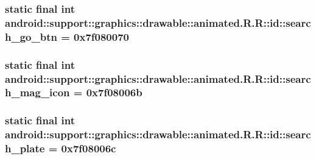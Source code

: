 \hypertarget{classandroid_1_1support_1_1graphics_1_1drawable_1_1animated_1_1_r_1_1id_186033891ff2b2fa7553756b01c98b4a}{
\subsubsection[{search\_\-go\_\-btn}]{\setlength{\rightskip}{0pt plus 5cm}static final int android::support::graphics::drawable::animated.R.R::id::search\_\-go\_\-btn = 0x7f080070}}
\label{classandroid_1_1support_1_1graphics_1_1drawable_1_1animated_1_1_r_1_1id_186033891ff2b2fa7553756b01c98b4a}


\hypertarget{classandroid_1_1support_1_1graphics_1_1drawable_1_1animated_1_1_r_1_1id_9df229b231a2cbe52d8a0ac2d3d122d9}{
\subsubsection[{search\_\-mag\_\-icon}]{\setlength{\rightskip}{0pt plus 5cm}static final int android::support::graphics::drawable::animated.R.R::id::search\_\-mag\_\-icon = 0x7f08006b}}
\label{classandroid_1_1support_1_1graphics_1_1drawable_1_1animated_1_1_r_1_1id_9df229b231a2cbe52d8a0ac2d3d122d9}


\hypertarget{classandroid_1_1support_1_1graphics_1_1drawable_1_1animated_1_1_r_1_1id_6997e25f73ca24918535023752db0511}{
\subsubsection[{search\_\-plate}]{\setlength{\rightskip}{0pt plus 5cm}static final int android::support::graphics::drawable::animated.R.R::id::search\_\-plate = 0x7f08006c}}
\label{classandroid_1_1support_1_1graphics_1_1drawable_1_1animated_1_1_r_1_1id_6997e25f73ca24918535023752db0511}


